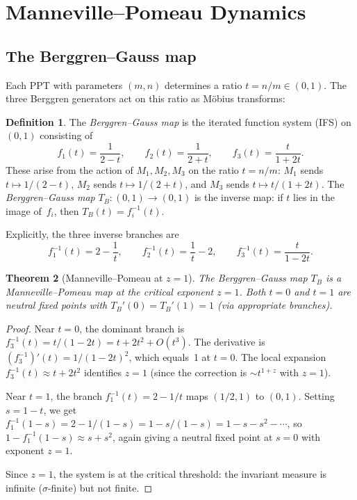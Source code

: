 \documentclass[12pt]{amsart}
\newtheorem{theorem}{Theorem}[section]
\theoremstyle{definition}
\newtheorem{definition}[theorem]{Definition}
\theoremstyle{remark}
\begin{document}
\section{Manneville--Pomeau Dynamics}\label{sec:mp}

\subsection{The Berggren--Gauss map}

Each PPT with parameters $(m,n)$ determines a ratio $t = n/m \in (0,1)$.
The three Berggren generators act on this ratio as M\"obius transforms:

\begin{definition}
The \emph{Berggren--Gauss map} is the iterated function system (IFS) on
$(0,1)$ consisting of
\begin{equation}\label{eq:ifs}
f_1(t) = \frac{1}{2-t}, \qquad
f_2(t) = \frac{1}{2+t}, \qquad
f_3(t) = \frac{t}{1+2t}.
\end{equation}
These arise from the action of $M_1, M_2, M_3$ on the ratio $t = n/m$:
$M_1$ sends $t \mapsto 1/(2-t)$, $M_2$ sends $t \mapsto 1/(2+t)$, and
$M_3$ sends $t \mapsto t/(1+2t)$.
The \emph{Berggren--Gauss map} $T_B\colon (0,1) \to (0,1)$ is the
inverse map: if $t$ lies in the image of~$f_i$, then $T_B(t) =
f_i^{-1}(t)$.
\end{definition}

Explicitly, the three inverse branches are
\begin{equation}\label{eq:inverse}
f_1^{-1}(t) = 2 - \frac{1}{t}, \qquad
f_2^{-1}(t) = \frac{1}{t} - 2, \qquad
f_3^{-1}(t) = \frac{t}{1-2t}.
\end{equation}

\begin{theorem}[Manneville--Pomeau at $z=1$]\label{thm:mp}
The Berggren--Gauss map $T_B$ is a Manneville--Pomeau map at the
critical exponent $z=1$.  Both $t=0$ and $t=1$ are neutral fixed points
with $T_B'(0) = T_B'(1) = 1$ (via appropriate branches).
\end{theorem}

\begin{proof}
Near $t=0$, the dominant branch is $f_3^{-1}(t) = t/(1-2t) =
t + 2t^2 + O(t^3)$.  The derivative is $(f_3^{-1})'(t) =
1/(1-2t)^2$, which equals~1 at $t=0$.  The local expansion
$f_3^{-1}(t) \approx t + 2t^2$ identifies $z=1$ (since the correction
is $\sim t^{1+z}$ with $z=1$).

Near $t=1$, the branch $f_1^{-1}(t) = 2 - 1/t$ maps $(1/2, 1)$ to
$(0,1)$.  Setting $s = 1-t$, we get $f_1^{-1}(1-s) = 2 - 1/(1-s) =
1 - s/(1-s) = 1 - s - s^2 - \cdots$, so $1 - f_1^{-1}(1-s) \approx
s + s^2$, again giving a neutral fixed point at $s=0$ with exponent
$z=1$.

Since $z=1$, the system is at the critical threshold: the invariant
measure is infinite ($\sigma$-finite) but not finite.
\end{proof}
\end{document}
